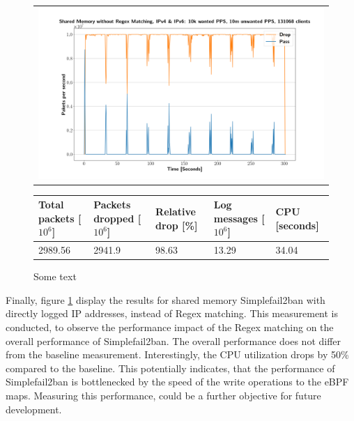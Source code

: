 \begin{figure}[!h]
	\centering
	\scriptsize
	\begin{tabular}{c}
    	\centerline{\includegraphics[width=1.2\textwidth]{images/simplefail2ban_shm_nr_ipv46_v10k_iv10m_c131068.png}}
	\end{tabular}
	\begin{tabular}{lllll}
		\toprule
		\textbf{Total packets [$10^6$]} & \textbf{Packets dropped [$10^6$]} & \textbf{Relative drop [\%]} & \textbf{Log messages [$10^6$]} & \textbf{CPU [seconds]} \\ \midrule 
		2989.56 & 2941.9 & 98.63 & 13.29 & 34.04 \\
		\bottomrule
	\end{tabular}
	\caption[Simplefail2ban, Shared Memory without Regex Matching]{Some text}
	\label{fig:simplefail2ban:shm:nr}
\end{figure}

Finally, figure \ref{fig:simplefail2ban:shm:nr} display the results for shared memory Simplefail2ban with directly logged \ac{IP} addresses, instead of \ac{Regex} matching.
This measurement is conducted, to observe the performance impact of the \ac{Regex} matching on the overall performance of Simplefail2ban. The overall performance does not differ
from the baseline measurement. Interestingly, the \ac{CPU} utilization drops by 50\% compared to the baseline. This potentially indicates, that the performance of Simplefail2ban is bottlenecked by 
the speed of the write operations to the \ac{eBPF} maps. Measuring this performance, could be a further objective for future development.   
